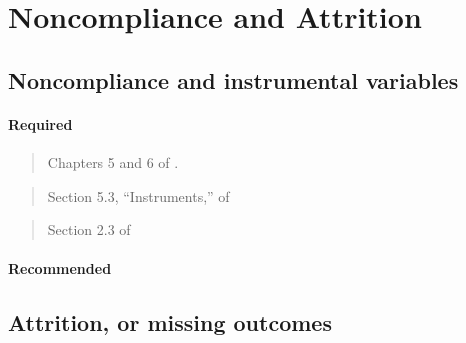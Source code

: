 \documentclass[12pt]{article}
\begin{document}
\begin{verse}  \end{verse}

\section{Noncompliance and Attrition}

\subsection{Noncompliance and instrumental variables}

\paragraph*{Required}

\begin{verse} Chapters 5 and 6 of . \end{verse}

\begin{verse}  \end{verse}

\begin{verse}
 \end{verse}

\begin{verse}
  Section 5.3, ``Instruments,'' of  \end{verse}

\begin{verse} Section 2.3 of  \end{verse}

\paragraph*{Recommended}

\begin{verse}  \end{verse}

\begin{verse}  \end{verse}

\begin{verse}  \end{verse}

\subsection{Attrition, or missing outcomes}
\end{document}

